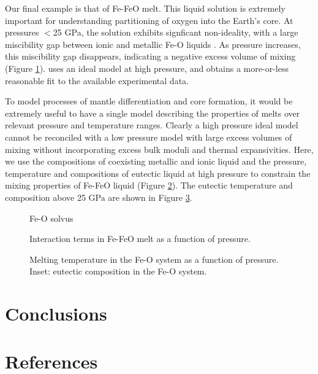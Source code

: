 \documentclass[review]{elsarticle}
\begin{document}
Our final example is that of Fe-FeO melt. This liquid solution is extremely important for understanding partitioning of oxygen into the Earth's core. At pressures $<$25 GPa, the solution exhibits signficant non-ideality, with a large miscibility gap between ionic and metallic Fe-O liquids \citep{Frostetal2010}. As pressure increases, this miscibility gap disappears, indicating a negative excess volume of mixing (Figure \ref{fig:Fe_O_solvus}). \cite{Kom2014} uses an ideal model at high pressure, and obtains a more-or-less reasonable fit to the available experimental data. 

To model processes of mantle differentiation and core formation, it would be extremely useful to have a single model describing the properties of melts over relevant pressure and temperature ranges. Clearly a high pressure ideal model cannot be reconciled with a low pressure model with large excess volumes of mixing without incorporating excess bulk moduli and thermal expansivities. Here, we use the compositions of coexisting metallic and ionic liquid \citep{} and the pressure, temperature and compositions of eutectic liquid at high pressure \citep{} to constrain the mixing properties of Fe-FeO liquid (Figure \ref{fig:Fe_O_interaction}). The eutectic temperature and composition above 25 GPa are shown in Figure \ref{fig:Fe_O_melting}.

\begin{figure}[ht!]
  \centering
  \caption{Fe-O solvus}
  \label{fig:Fe_O_solvus}
\end{figure}

\begin{figure}[ht!]
  \centering
  \caption{Interaction terms in Fe-FeO melt as a function of pressure.}
  \label{fig:Fe_O_interaction}
\end{figure}

\begin{figure}[ht!]
  \centering
  \caption{Melting temperature in the Fe-O system as a function of pressure. Inset: eutectic composition in the Fe-O system.}
  \label{fig:Fe_O_melting}
\end{figure}




\section{Conclusions}

\cite{DKS2013}

\clearpage
\section*{References}


\end{document}
